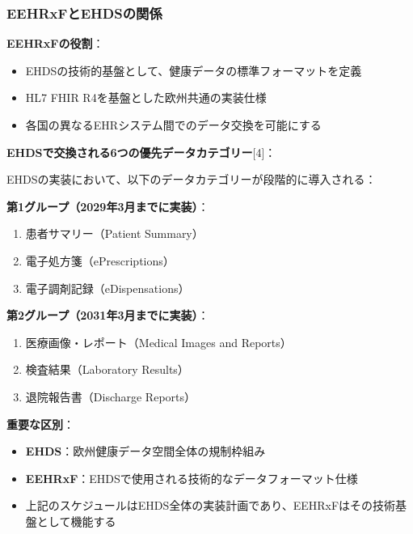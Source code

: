 \documentclass[
  a4paper,
  a4paper,
  11pt]{ltjsbook}
\providecommand{\tightlist}{%
  \setlength{\itemsep}{0pt}\setlength{\parskip}{0pt}}
\begin{document}
\subsubsection{EEHRxFとEHDSの関係}\label{eehrxfux3068ehdsux306eux95a2ux4fc2}

\textbf{EEHRxFの役割}：

\begin{itemize}
\tightlist
\item
  EHDSの技術的基盤として、健康データの標準フォーマットを定義
\item
  HL7 FHIR R4を基盤とした欧州共通の実装仕様
\item
  各国の異なるEHRシステム間でのデータ交換を可能にする
\end{itemize}

\textbf{EHDSで交換される6つの優先データカテゴリー}{[}4{]}：

EHDSの実装において、以下のデータカテゴリーが段階的に導入される：

\textbf{第1グループ（2029年3月までに実装）}：

\begin{enumerate}
\def\labelenumi{\arabic{enumi}.}
\tightlist
\item
  患者サマリー（Patient Summary）
\item
  電子処方箋（ePrescriptions）\\
\item
  電子調剤記録（eDispensations）
\end{enumerate}

\textbf{第2グループ（2031年3月までに実装）}：

\begin{enumerate}
\def\labelenumi{\arabic{enumi}.}
\setcounter{enumi}{3}
\tightlist
\item
  医療画像・レポート（Medical Images and Reports）
\item
  検査結果（Laboratory Results）
\item
  退院報告書（Discharge Reports）
\end{enumerate}

\begin{tcolorbox}[enhanced jigsaw, toprule=.15mm, bottomtitle=1mm, coltitle=black, left=2mm, opacityback=0, arc=.35mm, colbacktitle=quarto-callout-important-color!10!white, colback=white, opacitybacktitle=0.6, bottomrule=.15mm, rightrule=.15mm, breakable, title=\textcolor{quarto-callout-important-color}{\faExclamation}\hspace{0.5em}{Important}, toptitle=1mm, titlerule=0mm, colframe=quarto-callout-important-color-frame, leftrule=.75mm]

\textbf{重要な区別}：

\begin{itemize}
\tightlist
\item
  \textbf{EHDS}：欧州健康データ空間全体の規制枠組み
\item
  \textbf{EEHRxF}：EHDSで使用される技術的なデータフォーマット仕様
\item
  上記のスケジュールはEHDS全体の実装計画であり、EEHRxFはその技術基盤として機能する
\end{itemize}

\end{tcolorbox}
\end{document}

